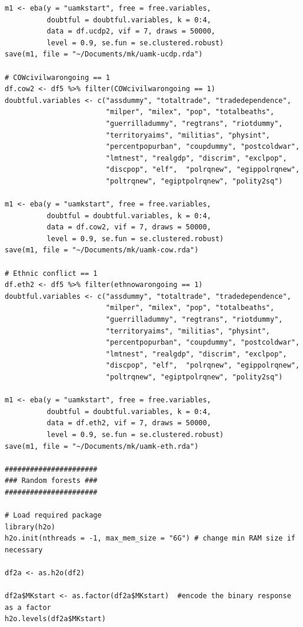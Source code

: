 \begin{verbatim}
m1 <- eba(y = "uamkstart", free = free.variables,
          doubtful = doubtful.variables, k = 0:4,
          data = df.ucdp2, vif = 7, draws = 50000,
          level = 0.9, se.fun = se.clustered.robust)
save(m1, file = "~/Documents/mk/uamk-ucdp.rda")

# COWcivilwarongoing == 1
df.cow2 <- df5 %>% filter(COWcivilwarongoing == 1)
doubtful.variables <- c("assdummy", "totaltrade", "tradedependence",
                        "milper", "milex", "pop", "totalbeaths",
                        "guerrilladummy", "regtrans", "riotdummy",
                        "territoryaims", "militias", "physint",
                        "percentpopurban", "coupdummy", "postcoldwar",
                        "lmtnest", "realgdp", "discrim", "exclpop",
                        "discpop", "elf",  "polrqnew", "egippolrqnew",
                        "poltrqnew", "egiptpolrqnew", "polity2sq")

m1 <- eba(y = "uamkstart", free = free.variables,
          doubtful = doubtful.variables, k = 0:4,
          data = df.cow2, vif = 7, draws = 50000,
          level = 0.9, se.fun = se.clustered.robust)
save(m1, file = "~/Documents/mk/uamk-cow.rda")

# Ethnic conflict == 1
df.eth2 <- df5 %>% filter(ethnowarongoing == 1)
doubtful.variables <- c("assdummy", "totaltrade", "tradedependence",
                        "milper", "milex", "pop", "totalbeaths",
                        "guerrilladummy", "regtrans", "riotdummy",
                        "territoryaims", "militias", "physint",
                        "percentpopurban", "coupdummy", "postcoldwar",
                        "lmtnest", "realgdp", "discrim", "exclpop", 
                        "discpop", "elf",  "polrqnew", "egippolrqnew",
                        "poltrqnew", "egiptpolrqnew", "polity2sq")

m1 <- eba(y = "uamkstart", free = free.variables,
          doubtful = doubtful.variables, k = 0:4,
          data = df.eth2, vif = 7, draws = 50000,
          level = 0.9, se.fun = se.clustered.robust)
save(m1, file = "~/Documents/mk/uamk-eth.rda")

######################
### Random forests ###
######################

# Load required package
library(h2o)
h2o.init(nthreads = -1, max_mem_size = "6G") # change min RAM size if necessary

df2a <- as.h2o(df2)

df2a$MKstart <- as.factor(df2a$MKstart)  #encode the binary response as a factor
h2o.levels(df2a$MKstart)


\end{verbatim}
